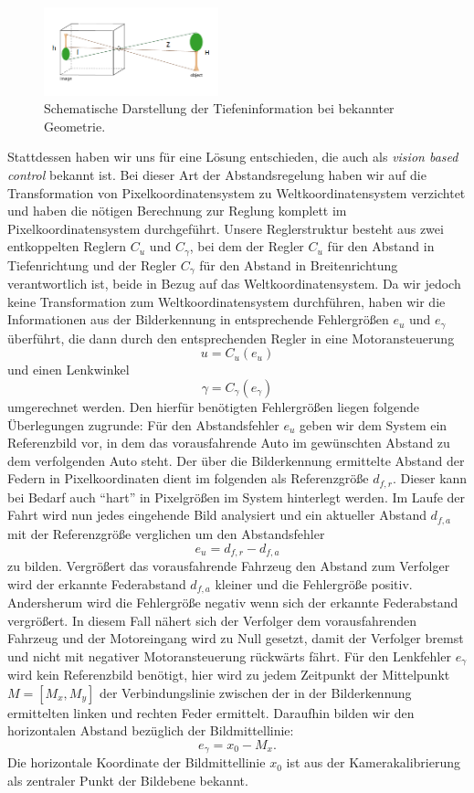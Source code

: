 \documentclass[10pt]{article}
\begin{document}
    \begin{figure}[hbtp]
        \centering
        \includegraphics[width=0.45\textwidth]{Pinholeobject_label}
        \caption{Schematische Darstellung der Tiefeninformation bei bekannter Geometrie.}\label{fig:reifenradius}
    \end{figure}
    Stattdessen haben wir uns für eine Lösung entschieden, die auch als \textit{vision based control} bekannt ist.
    Bei dieser Art der Abstandsregelung haben wir auf die Transformation von Pixelkoordinatensystem zu Weltkoordinatensystem verzichtet und haben die nötigen Berechnung zur Reglung komplett im Pixelkoordinatensystem durchgeführt.
    Unsere Reglerstruktur besteht aus zwei entkoppelten Reglern $C_u$ und $C_{\gamma}$, bei dem der Regler $C_u$ für den Abstand in Tiefenrichtung und der Regler $C_{\gamma}$ für den Abstand in Breitenrichtung verantwortlich ist, beide in Bezug auf das Weltkoordinatensystem.
    Da wir jedoch keine Transformation zum Weltkoordinatensystem durchführen, haben wir die Informationen aus der Bilderkennung in entsprechende Fehlergrößen $e_u$ und $e_{\gamma}$ überführt, die dann durch den entsprechenden Regler in eine Motoransteuerung \[u = C_u(e_u)\] und einen Lenkwinkel \[\gamma = C_{\gamma}(e_{\gamma})\] umgerechnet werden.
    Den hierfür benötigten Fehlergrößen liegen folgende Überlegungen zugrunde:
    Für den Abstandsfehler $e_u$ geben wir dem System ein Referenzbild vor, in dem das vorausfahrende Auto im gewünschten Abstand zu dem verfolgenden Auto steht.
    Der über die Bilderkennung ermittelte Abstand der Federn in Pixelkoordinaten dient im folgenden als Referenzgröße $d_{f,r}$.
    Dieser kann bei Bedarf auch \enquote{hart} in Pixelgrößen im System hinterlegt werden.
    Im Laufe der Fahrt wird nun jedes eingehende Bild analysiert und ein aktueller Abstand $d_{f,a}$ mit der Referenzgröße verglichen um den Abstandsfehler \[
    e_u = d_{f,r} -d_{f,a}
    \] zu bilden.
    Vergrößert das vorausfahrende Fahrzeug den Abstand zum Verfolger wird der erkannte Federabstand $ d_{f,a}$ kleiner und die Fehlergröße positiv.
    Andersherum wird die Fehlergröße negativ wenn sich der erkannte Federabstand vergrößert.
    In diesem Fall nähert sich der Verfolger dem vorausfahrenden Fahrzeug und der Motoreingang wird zu Null gesetzt, damit der Verfolger bremst und nicht mit negativer Motoransteuerung rückwärts fährt.
    Für den Lenkfehler $e_{\gamma}$ wird kein Referenzbild benötigt, hier wird zu jedem Zeitpunkt der Mittelpunkt $M=\left[M_x, M_y\right]$ der Verbindungslinie zwischen der in der Bilderkennung ermittelten linken und rechten Feder ermittelt.
    Daraufhin bilden wir den horizontalen Abstand bezüglich der Bildmittellinie: \[
    e_{\gamma} = x_0 - M_x.
    \]
    Die horizontale Koordinate der Bildmittellinie $x_0$ ist aus der Kamerakalibrierung als zentraler Punkt der Bildebene bekannt.
\end{document}
